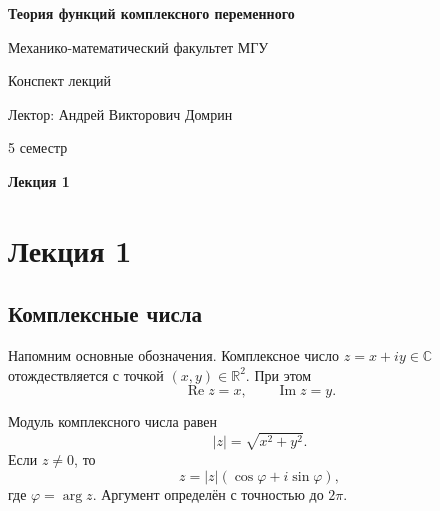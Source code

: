 \documentclass[12pt,a4paper]{article}
\newcommand{\CC}{\mathbb C}
\newcommand{\RR}{\mathbb R}
\begin{document}
\begin{titlepage}
\begin{center}

\vspace*{1.5cm}

{\LARGE\bfseries Теория функций комплексного переменного}

\vspace{1.2cm}

{\large Механико-математический факультет МГУ}

\vspace{2cm}

{\Large Конспект лекций}

\vspace{1.5cm}

{\large Лектор: Андрей Викторович Домрин}

\vspace{0.7cm}

{\large 5 семестр}

\vfill

{\Large\bfseries Лекция 1}

\vspace{1.5cm}

\end{center}
\end{titlepage}

\tableofcontents
\newpage

\section{Лекция 1}

\subsection{Комплексные числа}

Напомним основные обозначения. Комплексное число
\(z=x+iy\in\CC\) отождествляется с точкой \((x,y)\in\RR^2\). При этом
\[
\operatorname{Re}z=x,\qquad \operatorname{Im}z=y.
\]

Модуль комплексного числа равен
\[
|z|=\sqrt{x^2+y^2}.
\]
Если \(z\neq0\), то
\[
z=|z|(\cos\varphi+i\sin\varphi),
\]
где \(\varphi=\arg z\). Аргумент определён с точностью до \(2\pi\).
\end{document}
